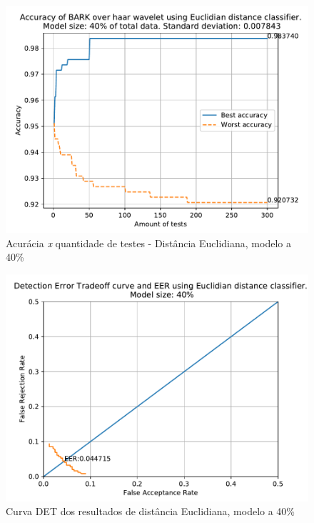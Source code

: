 			\begin{figure}[H]
				\centering
				\includegraphics[width=.9\linewidth]{images/results/confusionMatrices/classifier_Euclidian_40}
				\caption{Acurácia \textit{x} quantidade de testes - Distância Euclidiana, modelo a 40\%}
				\label{fig:classifiereuclidian40}
			\end{figure}
		
			\begin{figure}[H]
				\centering
				\includegraphics[width=.9\linewidth]{images/results/det/DET_for_classifier_Euclidian_40}
				\caption{Curva DET dos resultados de distância Euclidiana, modelo a 40\%}
				\label{fig:detforclassifiereuclidian40}
			\end{figure}
		
